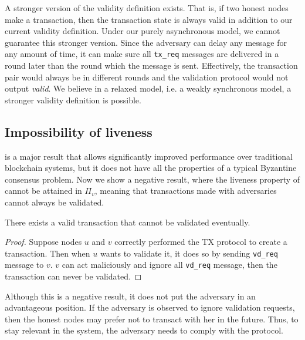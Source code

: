 A stronger version of the validity definition exists.
That is, if two honest nodes make a transaction,
then the transaction state is always valid in addition to our current validity definition.
Under our purely asynchronous model, we cannot guarantee this stronger version.
Since the adversary can delay any message for any amount of time,
it can make sure all \texttt{tx\_req} messages are delivered in a round later than the round which the message is sent.
Effectively, the transaction pair would always be in different rounds and the validation protocol would not output \emph{valid}.
We believe in a relaxed model, i.e. a weakly synchronous model, a stronger validity definition is possible.

\subsection{Impossibility of liveness}
 is a major result that allows significantly improved performance over traditional blockchain systems,
but it does not have all the properties of a typical Byzantine consensus problem.
Now we show a negative result, where the liveness property of  cannot be attained in $\Pi_v$,
meaning that transactions made with adversaries cannot always be validated.

\begin{lemma}
There exists a valid transaction that cannot be validated eventually.
\end{lemma}
\begin{proof}
Suppose nodes $u$ and $v$ correctly performed the TX protocol to create a transaction.
Then when $u$ wants to validate it, it does so by sending \texttt{vd\_req} message to $v$.
$v$ can act maliciously and ignore all \texttt{vd\_req} message, then the transaction can never be validated.
\end{proof}
Although this is a negative result, it does not put the adversary in an advantageous position.
If the adversary is observed to ignore validation requests, then the honest nodes may prefer not to transact with her in the future.
Thus, to stay relevant in the system, the adversary needs to comply with the protocol.


